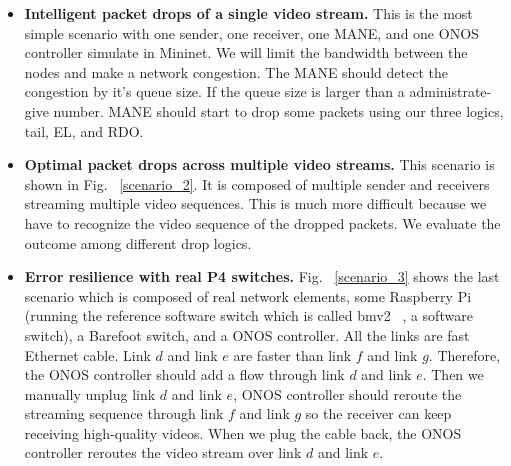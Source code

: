 \begin{itemize}
    \item{\bf Intelligent packet drops of a single video stream.}
    This is the most simple scenario with one sender, one receiver, one MANE, and one ONOS controller simulate in Mininet. We will limit the bandwidth between the nodes and make a network congestion. The MANE should detect the congestion by it's queue size. If the queue size is larger than a administrate-give number. MANE should start to drop some packets using our three logics, tail, EL, and RDO. 
    \item{\bf Optimal packet drops across multiple video streams.}
    This scenario is shown in Fig. ~\ref{scenario_2}. It is composed of multiple sender and receivers streaming multiple video sequences. This is much more difficult because we have to recognize the video sequence of the dropped packets. We evaluate the outcome among different drop logics.
    \item {\bf Error resilience with real P4 switches.}
    Fig. ~\ref{scenario_3} shows the last scenario which is composed of real network elements, some Raspberry Pi (running the reference software switch which is called bmv2 ~\cite{bmv2}, a software switch), a Barefoot switch, and a ONOS controller. All the links are fast Ethernet cable. Link $d$ and link $e$ are faster than link $f$ and link $g$. Therefore, the ONOS controller should add a flow through link $d$ and link $e$. Then we manually unplug link $d$ and link $e$, ONOS controller should reroute the streaming sequence through link $f$ and link $g$ so the receiver can keep receiving high-quality videos. When we plug the cable back, the ONOS controller reroutes the video stream over link $d$ and link $e$.
\end{itemize}
